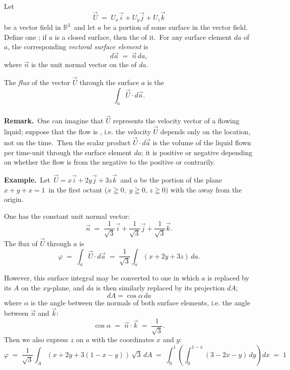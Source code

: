 \documentclass[12pt]{article}
\theoremstyle{definition}
\begin{document}
 

Let
$$\vec{U} \;=\; U_x\vec{i}+U_y\vec{j}+U_z\vec{k}$$
be a vector field in $\mathbb{R}^3$\, and let $a$ be a portion of some surface in the vector field.\, Define one ; if $a$ is a closed surface, then the  of it.\, For any surface element $da$ of $a$, the corresponding {\em vectoral surface element} is
$$d\vec{a} \;=\; \vec{n}\,da,$$
where $\vec{n}$ is the unit normal vector on the  of $da$.


  The {\em flux} of the vector $\vec{U}$ through the surface $a$ is the 
$$\int_a\vec{U} \cdot d\vec{a}.$$\\

\textbf{Remark.}\, One can imagine that $\vec{U}$ represents the velocity vector of a flowing liquid; suppose that the flow is , i.e. the velocity $\vec{U}$ depends only on the location, not on the time.\, Then the scalar product $\vec{U} \cdot d\vec{a}$ is the volume of the liquid flown per time-unit through the surface element $da$; it is positive or negative depending on whether the flow is from the negative  to the positive  or contrarily.

  \textbf{Example.}\, Let\, $\vec{U} = x\vec{i}+2y\vec{j}+3z\vec{k}$\, and $a$ be the portion of the plane \,$x+y+x = 1$\, in the first octant ($x \geqq 0,\; y \geqq 0,\, z \geqq 0$) with the  away from the origin.

 One has the constant unit normal vector:
$$\vec{n} \;=\; \frac{1}{\sqrt{3}}\vec{i}+\frac{1}{\sqrt{3}}\vec{j}+\frac{1}{\sqrt{3}}\vec{k}.$$
The flux of $\vec{U}$ through $a$ is
$$\varphi \;=\; \int_a\vec{U}\cdot d\vec{a} \;=\; \frac{1}{\sqrt{3}}\int_a(x+2y+3z)\,da.$$

However, this surface integral may be converted to one in which $a$ is replaced by its  $A$ on the $xy$-plane, and $da$ is then similarly replaced by its projection $dA$;
$$dA = \cos\alpha\, da$$
where $\alpha$ is the angle between the normals of both surface elements, i.e. the angle between $\vec{n}$ and $\vec{k}$:
$$\cos\alpha \;=\; \vec{n}\cdot\vec{k} \;=\; \frac{1}{\sqrt{3}}.$$
Then we also express $z$ on $a$ with the coordinates $x$ and $y$:
$$\varphi \;=\; \frac{1}{\sqrt{3}}\int_A(x+2y+3(1-x-y))\,\sqrt{3}\,dA
\;=\; \int_0^1\left(\int_0^{1-x}(3-2x-y)\,dy\right)dx \;=\; 1$$


\end{document}
